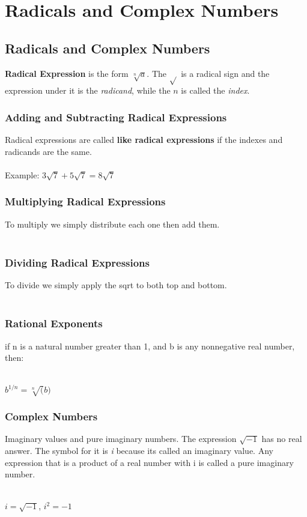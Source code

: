 \chapter{Radicals and Complex Numbers}
\section{Radicals and Complex Numbers}

\textbf{Radical Expression} is the form $\sqrt[n]{a}$. The $\sqrt{}$ is a radical sign and the expression under it is the \textit{radicand}, while the $n$ is called the \textit{index}.
\begin{center}
\end{center}

\subsection{Adding and Subtracting Radical Expressions}

Radical expressions are called \textbf{like radical expressions} if the indexes and radicands are the same. \\
\\
Example: $3\sqrt{7} + 5\sqrt{7} = 8\sqrt{7}$

\subsection{Multiplying Radical Expressions}
To multiply we simply distribute each one then add them.\\
\\
\subsection{Dividing Radical Expressions}
To divide we simply apply the sqrt to both top and bottom.\\
\\
\subsection{Rational Exponents}
if n is a natural number greater than 1, and b is any nonnegative real number, then:\\
\\
\begin{center}
	$b^{1/n}=\sqrt[n](b)$
\end{center}

\subsection{Complex Numbers}
Imaginary values and pure imaginary numbers. The expression $\sqrt{-1}$ has no real answer. The symbol for it is \textit{i} because its called an imaginary value. Any expression that is a product of a real number with i is called a pure imaginary number. \\
\\
\begin{center}
	$i = \sqrt{-1}$, $ i^2 = -1$
\end{center}
